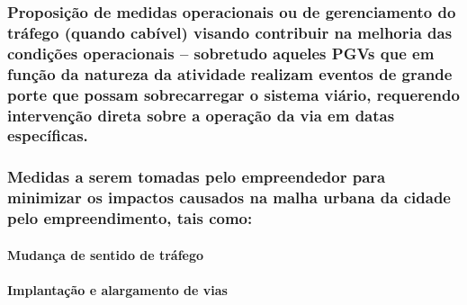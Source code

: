 \documentclass[]{article}
\let\oldparagraph\paragraph
\renewcommand{\paragraph}[1]{\oldparagraph{#1}\mbox{}}
\begin{document}
\hypertarget{proposiuxe7uxe3o-de-medidas-operacionais-ou-de-gerenciamento-do-truxe1fego-quando-cabuxedvel-visando-contribuir-na-melhoria-das-condiuxe7uxf5es-operacionais-sobretudo-aqueles-pgvs-que-em-funuxe7uxe3o-da-natureza-da-atividade-realizam-eventos-de-grande-porte-que-possam-sobrecarregar-o-sistema-viuxe1rio-requerendo-intervenuxe7uxe3o-direta-sobre-a-operauxe7uxe3o-da-via-em-datas-especuxedficas.}{%
\subsubsection{Proposição de medidas operacionais ou de gerenciamento do
tráfego (quando cabível) visando contribuir na melhoria das condições
operacionais -- sobretudo aqueles PGVs que em função da natureza da
atividade realizam eventos de grande porte que possam sobrecarregar o
sistema viário, requerendo intervenção direta sobre a operação da via em
datas
específicas.}\label{proposiuxe7uxe3o-de-medidas-operacionais-ou-de-gerenciamento-do-truxe1fego-quando-cabuxedvel-visando-contribuir-na-melhoria-das-condiuxe7uxf5es-operacionais-sobretudo-aqueles-pgvs-que-em-funuxe7uxe3o-da-natureza-da-atividade-realizam-eventos-de-grande-porte-que-possam-sobrecarregar-o-sistema-viuxe1rio-requerendo-intervenuxe7uxe3o-direta-sobre-a-operauxe7uxe3o-da-via-em-datas-especuxedficas.}}

\hypertarget{medidas-a-serem-tomadas-pelo-empreendedor-para-minimizar-os-impactos-causados-na-malha-urbana-da-cidade-pelo-empreendimento-tais-como}{%
\subsubsection{Medidas a serem tomadas pelo empreendedor para minimizar
os impactos causados na malha urbana da cidade pelo empreendimento, tais
como:}\label{medidas-a-serem-tomadas-pelo-empreendedor-para-minimizar-os-impactos-causados-na-malha-urbana-da-cidade-pelo-empreendimento-tais-como}}

\hypertarget{mudanuxe7a-de-sentido-de-truxe1fego}{%
\paragraph{Mudança de sentido de
tráfego}\label{mudanuxe7a-de-sentido-de-truxe1fego}}

\hypertarget{implantauxe7uxe3o-e-alargamento-de-vias}{%
\paragraph{Implantação e alargamento de
vias}\label{implantauxe7uxe3o-e-alargamento-de-vias}}
\end{document}
